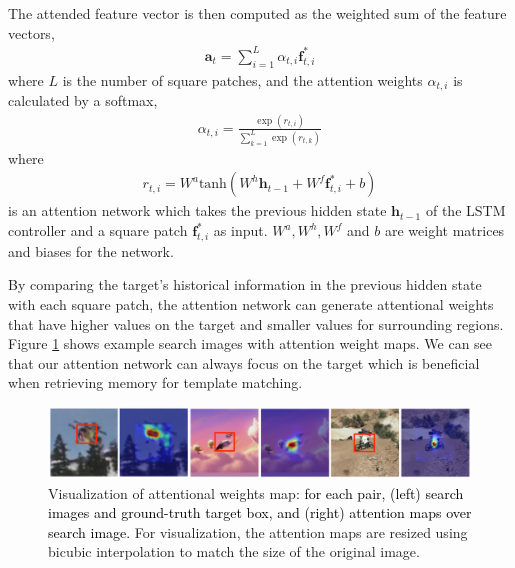 \documentclass[runningheads]{llncs}
\newcommand{\yty}[1]{\textcolor{black}{#1}}
\newcommand{\abc}[1]{\textcolor{black}{#1}}
\newcommand{\abcn}[1]{\textcolor{black}{#1}}
\begin{document}
The attended feature vector is then computed as the weighted sum of the feature vectors,
\begin{align}
\mathbf{a}_t = \sum_{i=1}^{L}\alpha_{t,i}\mathbf{f}^*_{t,i}
\end{align}
where $L$ is the number of square patches, and the attention weights $\alpha_{t,i}$ is calculated by a softmax, 
\begin{align}
\alpha_{t,i} = \frac{\exp(r_{t,i})}{\sum_{k=1}^{L}\exp(r_{t,k})}
\end{align}
where 
\begin{align}
r_{t,i} = W^a \text{tanh}(W^h \mathbf{h}_{t-1}+W^f \mathbf{f}^*_{t,i}+b)
\end{align}
is an attention network which takes the previous hidden state $\mathbf{h}_{t-1}$ of the LSTM controller and a square patch $\mathbf{f}^*_{t,i}$ as input. $W^a, W^h, W^f$ and $b$ are weight matrices and biases for the network.

By comparing the target's historical information in the previous hidden state with each square patch, the attention network can generate attentional weights that have higher values on the target and smaller values for surrounding regions.  Figure \ref{fig:3} shows example search images with attention weight maps. We can see that our attention network can always focus on the target which is beneficial when retrieving memory for template matching. 

\begin{figure}[t]
	\begin{center}
		\includegraphics[width=0.9\linewidth]{attention_row.jpg}
	\end{center}
	\vspace{-3mm}
	\caption{Visualization of attentional weights map: \abcn{for each pair, (left) search images and ground-truth target box, and (right) attention maps over search image.}
		For visualization, the attention maps are resized using bicubic interpolation to match the size of the original image.}
	\vspace{-2mm}
	\label{fig:3}
\end{figure}
\end{document}
